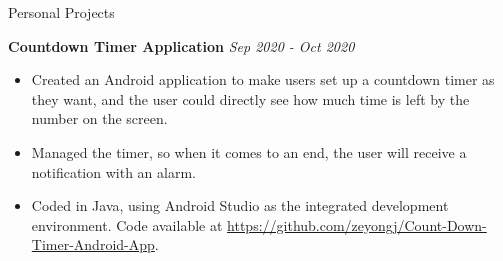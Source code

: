 \documentclass{resume} %
\begin{document}
\begin{rSection}{Personal Projects}

{\bf Countdown Timer Application} \hfill {\em Sep 2020 - Oct 2020} 
\begin{itemize}
    \vspace{-0.2cm}\item Created an Android application to make users set up a countdown timer as they want, and the user could directly see how much time is left by the number on the screen.
    \vspace{-0.2cm}\item Managed the timer, so when it comes to an end, the user will receive a notification with an alarm.
    \vspace{-0.2cm}\item Coded in Java, using Android Studio as the integrated development environment. Code available at \url{https://github.com/zeyongj/Count-Down-Timer-Android-App}.
\end{itemize}

\end{rSection}
\end{document}
